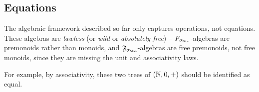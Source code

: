 \subsection{Equations}
\label{sec:universal-algebra:equations}

The algebraic framework described so far only captures operations, not equations.
%
These algebras are \emph{lawless} (or \emph{wild} or \emph{absolutely free}) --
$\SigMon$-algebras are premonoids rather than monoids,
and $\mathfrak{F}_{\sigma_{\mathsf{Mon}}}$-algebras are free premonoids, not free monoids,
since they are missing the unit and associativity laws.
\begin{toappendix}
    For example, by associativity, these two trees of $(\mathbb{N}, 0, +)$ should be identified as equal.
    \begin{center}
        \qquad\qquad
    \end{center}
\end{toappendix}
